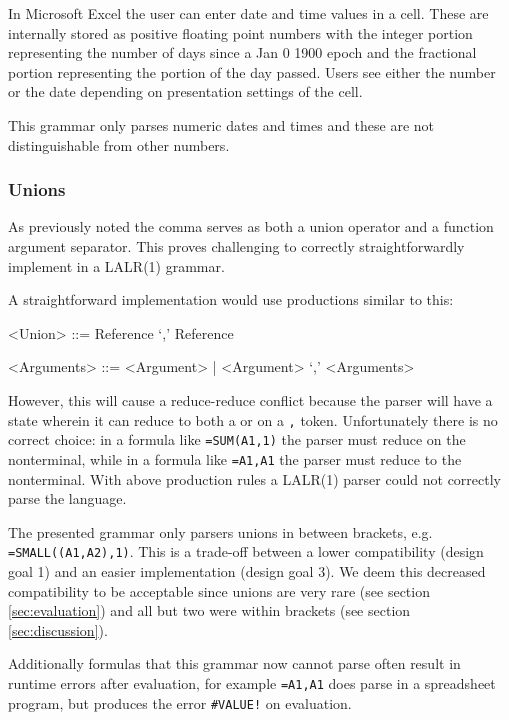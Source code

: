 \documentclass[conference]{IEEEtran}
\begin{document}
In Microsoft Excel the user can enter date and time values in a cell.
These are internally stored as positive floating point numbers with the integer portion representing the number of days since a Jan 0 1900 epoch and the fractional portion representing the portion of the day passed.
Users see either the number or the date depending on presentation settings of the cell.

This grammar only parses numeric dates and times and these are not distinguishable from other numbers.

\subsubsection{\textbf{Unions}}
\label{subsec:desing:unions}

As previously noted the comma serves as both a union operator and a function argument separator.
This proves challenging to correctly straightforwardly implement in a LALR(1) grammar.

A straightforward implementation would use productions similar to this:

\begin{grammar}
<Union> ::= Reference `,' Reference

<Arguments> ::= <Argument> | <Argument> `,' <Arguments>
\end{grammar}

However, this will cause a reduce-reduce conflict because the parser will have a state wherein it can reduce to both a  or  on a \texttt{,} token.
Unfortunately there is no correct choice: in a formula like \texttt{=SUM(A1,1)} the parser must reduce on the  nonterminal, while in a formula like \texttt{=A1,A1} the parser must reduce to the  nonterminal.
With above production rules a LALR(1) parser could not correctly parse the language.

The presented grammar only parsers unions in between brackets, e.g. \texttt{=SMALL((A1,A2),1)}.
This is a trade-off between a lower compatibility (design goal 1) and an easier implementation (design goal 3).
We deem this decreased compatibility to be acceptable since unions are very rare (see section \ref{sec:evaluation}) and all but two were within brackets (see section \ref{sec:discussion}).

Additionally formulas that this grammar now cannot parse often result in runtime errors after evaluation, for example \texttt{=A1,A1} does parse in a spreadsheet program, but produces the error \texttt{\#VALUE!} on evaluation.
\end{document}

